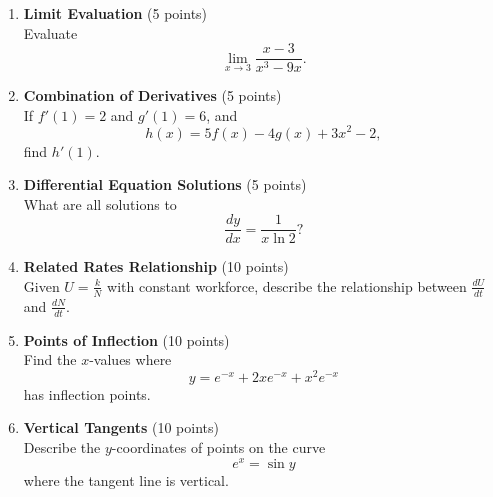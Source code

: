 \begin{enumerate}
  \item \textbf{Limit Evaluation} (5 points)\\
  Evaluate
  \[
    \lim_{x \to 3} \frac{x - 3}{x^3 - 9x}.
  \]
  \begin{subanswer}
  \end{subanswer}

  \item \textbf{Combination of Derivatives} (5 points)\\
  If $f'(1) = 2$ and $g'(1) = 6$, and
  \[
    h(x) = 5f(x) - 4g(x) + 3x^2 - 2,
  \]
  find $h'(1)$.
  \begin{subanswer}
  \end{subanswer}

  \item \textbf{Differential Equation Solutions} (5 points)\\
  What are all solutions to
  \[
    \frac{dy}{dx} = \frac{1}{x \ln 2}?
  \]
  \begin{subanswer}
  \end{subanswer}

  \item \textbf{Related Rates Relationship} (10 points)\\
  Given $U = \tfrac{k}{N}$ with constant workforce, describe the relationship between $\tfrac{dU}{dt}$ and $\tfrac{dN}{dt}$.
  \begin{subanswer}
  \end{subanswer}

  \item \textbf{Points of Inflection} (10 points)\\
  Find the $x$-values where
  \[
    y = e^{-x} + 2x e^{-x} + x^2 e^{-x}
  \]
  has inflection points.
  \begin{subanswer}
  \end{subanswer}

  \item \textbf{Vertical Tangents} (10 points)\\
  Describe the $y$-coordinates of points on the curve
  \[
    e^x = \sin y
  \]
  where the tangent line is vertical.
  \begin{subanswer}
  \end{subanswer}











\end{enumerate}
